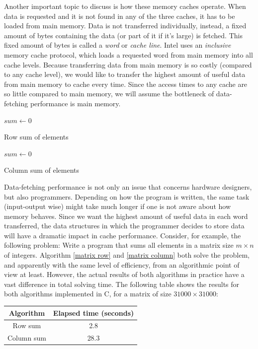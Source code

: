 \documentclass[12pt]{diicc}
\begin{document}
Another important topic to discuss is how these memory caches operate. When data is requested and it is not found in any of the three caches, it has to be loaded from main memory. Data is not transferred individually, instead, a fixed amount of bytes containing the data (or part of it if it's large) is fetched. This fixed amount of bytes is called a \textit{word} or \textit{cache line}. Intel uses an \textit{inclusive} memory cache protocol, which loads a requested word from main memory into all cache levels. 
Because transferring data from main memory is so costly (compared to any cache level), we would like to transfer the highest amount of useful data from main memory to cache every time. Since the access times to any cache are so little compared to main memory, we will assume the bottleneck of data-fetching performance is main memory. 

\begin{algorithm}
$sum \leftarrow 0$ \\
\caption{Row sum of elements\label{matrix row}}
\end{algorithm}

\begin{algorithm}
$sum \leftarrow 0$ \\
\caption{Column sum of elements\label{matrix column}}
\end{algorithm}

Data-fetching performance is not only an issue that concerns hardware designers, but also programmers. Depending on how the program is written, the same task (input-output wise) might take much longer if one is not aware about how memory behaves. Since we want the highest amount of useful data in each word transferred, the data structures in which the programmer decides to store data will have a dramatic impact in cache performance. Consider, for example, the following problem: Write a program that sums all elements in a matrix size $m \times n$ of integers. Algorithm \ref{matrix row} and \ref{matrix column} both solve the problem, and apparently with the same level of efficiency, from an algorithmic point of view at least. However, the actual results of both algorithms in practice have a vast difference in total solving time. The following table shows the results for both algorithms implemented in C, for a matrix of size $31000 \times 31000$:
\begin{center}
\begin{tabular}{ c | c }
  Algorithm & Elapsed time (seconds) \\ \hline
  Row sum & 2.8 \\
  Column sum & 28.3 \\ 
\end{tabular}
\end{center}
\end{document}
